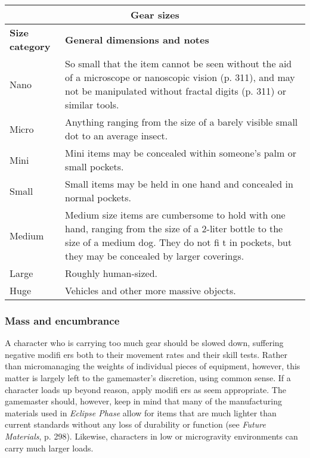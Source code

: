 \begin{table}
\begin{tabularx}{\textwidth}{|l|X|}
\hline
\multicolumn{2}{|c|}{\textbf{Gear sizes}}			\\
\hline
\textbf{Size category}	& \textbf{General dimensions and notes} \\
Nano					& So small that the item cannot be seen without the aid of a microscope or nanoscopic vision (p. 311), and may not be manipulated without fractal digits (p. 311) or similar tools. \\
\hline
Micro				& Anything ranging from the size of a barely visible small dot to an average insect. \\
\hline
Mini					& Mini items may be concealed within someone’s palm or small pockets. \\
\hline
Small				& Small items may be held in one hand and concealed in normal pockets.\\
\hline
Medium				& Medium size items are cumbersome to hold with one hand, ranging from the size of a 2-liter bottle to the size of a medium dog. They do not fi t in pockets, but they may be concealed by larger coverings. \\
\hline
Large				& Roughly human-sized. \\
\hline
Huge					& Vehicles and other more massive objects. \\
\hline
\end{tabularx}
\label{tab:gear-sizes}
\end{table}


\subsubsection{Mass and encumbrance}

A character who is carrying too much gear should
be slowed down, suffering negative modifi ers both
to their movement rates and their skill tests. Rather
than micromanaging the weights of individual pieces
of equipment, however, this matter is largely left to
the gamemaster’s discretion, using common sense. If a
character loads up beyond reason, apply modifi ers as
seem appropriate. The gamemaster should, however,
keep in mind that many of the manufacturing materials
used in \emph{Eclipse Phase} allow for items that are
much lighter than current standards without any loss
of durability or function (see \emph{Future Materials}, p. 298).
Likewise, characters in low or microgravity environments
can carry much larger loads.

